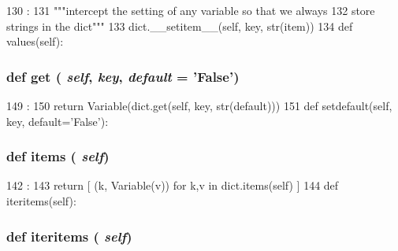 \begin{DoxyCode}
130                                     :
131         """intercept the setting of any variable so that we always
132         store strings in the dict"""
133         dict.__setitem__(self, key, str(item))
134 
    def values(self):
\end{DoxyCode}
\hypertarget{classm5_1_1util_1_1smartdict_1_1SmartDict_a444a1328efb32d5d9d2dcb2efe855d3b}{
\subsubsection[{get}]{\setlength{\rightskip}{0pt plus 5cm}def get ( {\em self}, \/   {\em key}, \/   {\em default} = {\ttfamily 'False'})}}
\label{classm5_1_1util_1_1smartdict_1_1SmartDict_a444a1328efb32d5d9d2dcb2efe855d3b}



\begin{DoxyCode}
149                                        :
150         return Variable(dict.get(self, key, str(default)))
151 
    def setdefault(self, key, default='False'):
\end{DoxyCode}
\hypertarget{classm5_1_1util_1_1smartdict_1_1SmartDict_a717291221885735d6870d7179083ec07}{
\subsubsection[{items}]{\setlength{\rightskip}{0pt plus 5cm}def items ( {\em self})}}
\label{classm5_1_1util_1_1smartdict_1_1SmartDict_a717291221885735d6870d7179083ec07}



\begin{DoxyCode}
142                    :
143         return [ (k, Variable(v)) for k,v in dict.items(self) ]
144 
    def iteritems(self):
\end{DoxyCode}
\hypertarget{classm5_1_1util_1_1smartdict_1_1SmartDict_a13d39839ad1cfd4c47f524735933c0bf}{
\subsubsection[{iteritems}]{\setlength{\rightskip}{0pt plus 5cm}def iteritems ( {\em self})}}
\label{classm5_1_1util_1_1smartdict_1_1SmartDict_a13d39839ad1cfd4c47f524735933c0bf}



